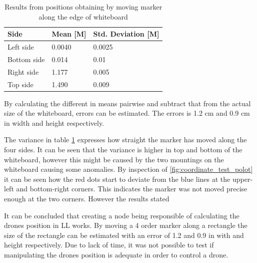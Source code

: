 \begin{table}[H]
\centering
\caption{Results from positions obtaining by moving marker along the edge of whiteboard}
\label{tab:converter_results}
\begin{tabular}{@{}|l|l|l|@{}}
\toprule
\textbf{Side} & \textbf{Mean [M]}  & \textbf{Std. Deviation {[}M{]}} \\ \midrule
Left side     & 0.0040 & 0.0025                  \\ \midrule
Bottom side   & 0.014 & 0.01                   \\ \midrule
Right side    & 1.177 & 0.005                   \\ \midrule
Top side      & 1.490 & 0.009                   \\ \bottomrule
\end{tabular}
\end{table}

By calculating the different in means pairwise and subtract that from the actual size of the whiteboard, errors can be estimated.
The errors is 1.2 cm and 0.9 cm in width and height respectively.

The variance in table \ref{tab:converter_results} expresses how straight the marker has moved along the four sides. It can be seen that the variance is higher in top and bottom of the whiteboard, however this might be caused by the two mountings on the whiteboard causing some anomalies.
By inspection of \ref{fig:coordinate_test_polot} it can be seen how the red dots start to deviate from the blue lines at the upper-left and bottom-right corners. This indicates the marker was not moved precise enough at the two corners. However the results stated 


It can be concluded that creating a node being responsible of calculating the drones position in {LL} works. By moving a 4 order marker along a rectangle the size of the rectangle can be estimated with an error of 1.2 and 0.9 in with and height respectively. Due to lack of time, it was not possible to test if manipulating the drones position is adequate in order to control a drone.